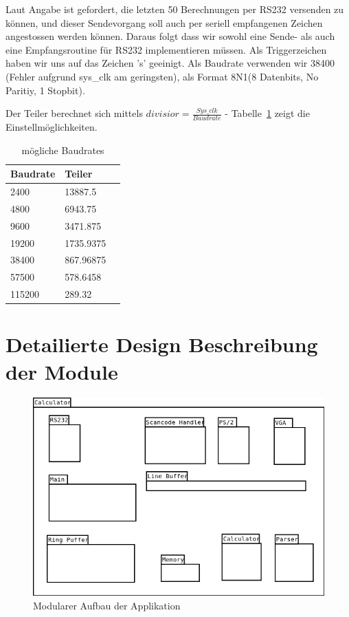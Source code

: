 Laut Angabe ist gefordert, die letzten 50 Berechnungen per RS232 versenden zu können, und dieser Sendevorgang soll auch per seriell empfangenen Zeichen angestossen werden können. Daraus folgt dass wir sowohl eine Sende- als auch eine Empfangsroutine für RS232 implementieren müssen. Als Triggerzeichen haben wir uns auf das Zeichen 's' geeinigt. Als Baudrate verwenden wir 38400 (Fehler aufgrund sys\_clk am geringsten), als Format 8N1(8 Datenbits, No Paritiy, 1 Stopbit).

Der Teiler berechnet sich mittels $divisior = \frac{Sys\_clk}{Baudrate}$ - Tabelle~\ref{tab:baudrates} zeigt die Einstellmöglichkeiten.


\begin{table}[!h]
\begin{center}
\begin{tabular}{|l|l|l|}
\hline
Baudrate  & Teiler\\
\hline
\hline

2400 & 13887.5 \\ 
 4800 & 6943.75\\
 9600 & 3471.875\\
 19200 & 1735.9375 \\
 38400 & 867.96875 \\
 57500 & 578.6458 \\
 115200 & 289.32 \\
 
\hline
\end{tabular}
\end{center}
\caption{mögliche Baudrates}
\label{tab:baudrates}
\end{table}

\section{Detailierte Design Beschreibung der Module}

\begin{figure}[!ht]
	\centering
	\includegraphics[scale=0.5]{figures/mod_view.png} 
	\caption{Modularer Aufbau der Applikation}
	\label{fig:mod_view}
\end{figure}

